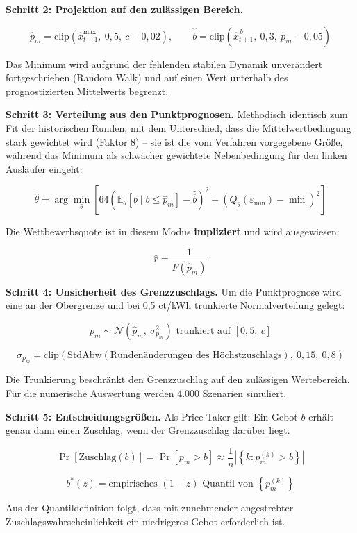\documentclass[
  a4paper,
  10pt]{article}
\begin{document}
\textbf{Schritt 2: Projektion auf den zulässigen Bereich.}

\[ \hat{p}_m = \mathrm{clip}\left(\hat{x}^{\max}_{t+1},\ 0{,}5,\ c - 0{,}02\right), \qquad \hat{\overline{b}} = \mathrm{clip}\left(\hat{x}^{\,\overline{b}}_{t+1},\ 0{,}3,\ \hat{p}_m - 0{,}05\right) \]

Das Minimum wird aufgrund der fehlenden stabilen Dynamik unverändert
fortgeschrieben (Random Walk) und auf einen Wert unterhalb des
prognostizierten Mittelwerts begrenzt.

\textbf{Schritt 3: Verteilung aus den Punktprognosen.} Methodisch
identisch zum Fit der historischen Runden, mit dem Unterschied, dass die
Mittelwertbedingung stark gewichtet wird (Faktor 8) -- sie ist die vom
Verfahren vorgegebene Größe, während das Minimum als schwächer
gewichtete Nebenbedingung für den linken Ausläufer eingeht:

\[ \hat{\theta} = \arg\min_{\theta}\left[ 64 \left(\mathbb{E}_\theta\left[b \mid b \leq \hat{p}_m\right] - \hat{\overline{b}}\right)^2 + \left(Q_\theta(\varepsilon_{\min}) - \min\right)^2 \right] \]

Die Wettbewerbsquote ist in diesem Modus \textbf{impliziert} und wird
ausgewiesen:

\[ \hat{r} = \frac{1}{F\left(\hat{p}_m\right)} \]

\textbf{Schritt 4: Unsicherheit des Grenzzuschlags.} Um die
Punktprognose wird eine an der Obergrenze und bei 0,5 ct/kWh trunkierte
Normalverteilung gelegt:

\[ p_m \sim \mathcal{N}\left(\hat{p}_m,\ \sigma_{p_m}^2\right) \text{ trunkiert auf } \left[0{,}5,\ c\right] \]

\[ \sigma_{p_m} = \mathrm{clip}\left(\mathrm{StdAbw}\left(\text{Rundenänderungen des Höchstzuschlags}\right),\ 0{,}15,\ 0{,}8\right) \]

Die Trunkierung beschränkt den Grenzzuschlag auf den zulässigen
Wertebereich. Für die numerische Auswertung werden 4.000 Szenarien
simuliert.

\textbf{Schritt 5: Entscheidungsgrößen.} Als Price-Taker gilt: Ein Gebot
\(b\) erhält genau dann einen Zuschlag, wenn der Grenzzuschlag darüber
liegt.

\[ \Pr\left[\text{Zuschlag}(b)\right] = \Pr\left[p_m > b\right] \approx \frac{1}{n}\left|\left\{k : p_m^{(k)} > b\right\}\right| \]

\[ b^{*}(z) = \text{empirisches } (1-z)\text{-Quantil von } \left\{p_m^{(k)}\right\} \]

Aus der Quantildefinition folgt, dass mit zunehmender angestrebter
Zuschlagswahrscheinlichkeit ein niedrigeres Gebot erforderlich ist.
\end{document}
